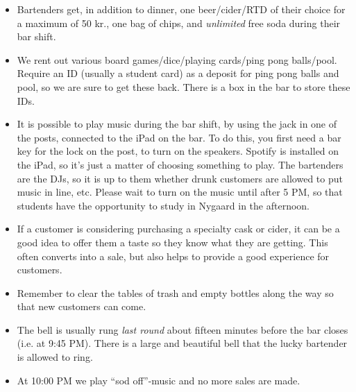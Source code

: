 \begin{itemize}
    \item Bartenders get, in addition to dinner, one beer/cider/RTD of their choice for a maximum of 50 kr.,
    one bag of chips, and \textit{unlimited} free soda during their bar shift.

    \item We rent out various board games/dice/playing cards/ping pong balls/pool.
    Require an ID (usually a student card) as a deposit for ping pong balls and pool,
    so we are sure to get these back.
    There is a box in the bar to store these IDs.

    \item It is possible to play music during the bar shift, by using the
    jack in one of the posts, connected to the iPad on the bar.
    To do this, you first need a bar key
    for the lock on the post, to turn on the speakers.
    Spotify is installed on the iPad, so it's just a matter of choosing something to play.
    The bartenders are the DJs, so it is up to them whether drunk customers are allowed to put music in line, etc.
    Please wait to turn on the music until after 5 PM, so that students have the opportunity to study in Nygaard in the afternoon.

    \item If a customer is considering purchasing a specialty cask or cider, it can be a good idea 
    to offer them a taste so they know what they are getting. This often converts into a sale, but 
    also helps to provide a good experience for customers.

    \item Remember to clear the tables of trash and empty bottles along the way so that new customers can come.

    \item The bell is usually rung \textit{last round}
    about fifteen minutes before the bar closes
    (i.e. at 9:45 PM). There is a large and beautiful bell that the lucky bartender
    is allowed to ring.

    \item At 10:00 PM we play ``sod off''-music and no more sales are made.
\end{itemize}
